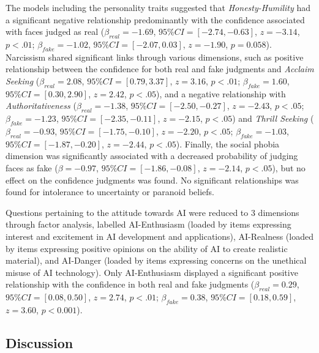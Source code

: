 \documentclass[
  man,floatsintext]{apa6}
\begin{document}
The models including the personality traits suggested that \emph{Honesty-Humility} had a significant negative relationship predominantly with the confidence associated with faces judged as real (\(\beta_{real} = -1.69\), \(95\% CI = [-2.74, -0.63]\), \(z = -3.14\), \(p < .01\); \(\beta_{fake} = -1.02\), \(95\% CI = [-2.07, 0.03]\), \(z = -1.90\), \(p = 0.058\)). Narcissism shared significant links through various dimensions, such as positive relationship between the confidence for both real and fake judgments and \emph{Acclaim Seeking} (\(\beta_{real} = 2.08\), \(95\% CI = [0.79, 3.37]\), \(z = 3.16\), \(p < .01\); \(\beta_{fake} = 1.60\), \(95\% CI = [0.30, 2.90]\), \(z = 2.42\), \(p < .05\)), and a negative relationship with \emph{Authoritativeness} (\(\beta_{real} = -1.38\), \(95\% CI = [-2.50, -0.27]\), \(z = -2.43\), \(p < .05\); \(\beta_{fake} = -1.23\), \(95\% CI = [-2.35, -0.11]\), \(z = -2.15\), \(p < .05\)) and \emph{Thrill Seeking} (\(\beta_{real} = -0.93\), \(95\% CI = [-1.75, -0.10]\), \(z = -2.20\), \(p < .05\); \(\beta_{fake} = -1.03\), \(95\% CI = [-1.87, -0.20]\), \(z = -2.44\), \(p < .05\)). Finally, the social phobia dimension was significantly associated with a decreased probability of judging faces as fake (\(\beta = -0.97\), \(95\% CI = [-1.86, -0.08]\), \(z = -2.14\), \(p < .05\)), but no effect on the confidence judgments was found. No significant relationships was found for intolerance to uncertainty or paranoid beliefs.

Questions pertaining to the attitude towards AI were reduced to 3 dimensions through factor analysis, labelled AI-Enthusiasm (loaded by items expressing interest and excitement in AI development and applications), AI-Realness (loaded by items expressing positive opinions on the ability of AI to create realistic material), and AI-Danger (loaded by items expressing concerns on the unethical misuse of AI technology). Only AI-Enthusiasm displayed a significant positive relationship with the confidence in both real and fake judgments (\(\beta_{real} = 0.29\), \(95\% CI = [0.08, 0.50]\), \(z = 2.74\), \(p < .01\); \(\beta_{fake} = 0.38\), \(95\% CI = [0.18, 0.59]\), \(z = 3.60\), \(p < 0.001\)).

\hypertarget{discussion}{%
\subsection{Discussion}\label{discussion}}
\end{document}
